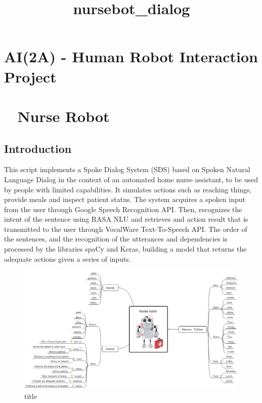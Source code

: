 \documentclass[11pt]{article}
\title{nursebot\_dialog}
\makeatletter
\def\maxwidth{\ifdim\Gin@nat@width>\linewidth\linewidth
    \else\Gin@nat@width\fi}
\let\Oldincludegraphics\includegraphics
\renewcommand{\includegraphics}[1]{\Oldincludegraphics[width=.8\maxwidth]{#1}}
\makeatother
\begin{document}
    
    
    \maketitle
    
    

    
    \hypertarget{ai2a---human-robot-interaction-project}{%
\section{AI(2A) - Human Robot Interaction
Project}\label{ai2a---human-robot-interaction-project}}

\hypertarget{nurse-robot}{%
\section{👩‍⚕️ Nurse Robot}\label{nurse-robot}}

    \hypertarget{introduction}{%
\subsection{Introduction}\label{introduction}}

This script implements a Spoke Dialog System (SDS) based on Spoken
Natural Language Dialog in the context of an automated home nurse
assistant, to be used by people with limited capabilities. It simulates
actions such as reaching things, provide meals and inspect patient
status. The system acquires a spoken input from the user through Google
Speech Recognition API. Then, recognizes the intent of the sentence
using RASA NLU and retrieves and action result that is transmitted to
the user through VocalWare Text-To-Speech API. The order of the
sentences, and the recognition of the utterances and dependencies is
processed by the libraries spaCy and Keras, building a model that
returns the adequate actions given a series of inputs.

    \begin{figure}
\centering
\includegraphics{images/NurseRobotMindmap.png}
\caption{title}
\end{figure}
\end{document}
